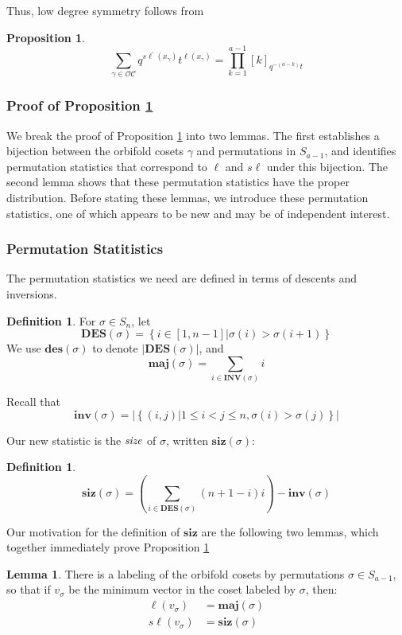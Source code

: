 \documentclass{amsart}[12pt]
\theoremstyle{definition}
\newtheorem{lemma}[dummy]{Lemma}
\newtheorem{definition}[dummy]{Definition}
\newtheorem{proposition}[dummy]{Proposition}
\newcommand{\OC}{\mathcal{OC}}
\newcommand{\sk}{s\ell}
\newcommand{\inv}{\mathbf{inv}}
\newcommand{\INV}{\mathbf{INV}}
\newcommand{\DES}{\mathbf{DES}}
\newcommand{\des}{\mathbf{des}}
\newcommand{\maj}{\mathbf{maj}}
\newcommand{\siz}{\mathbf{siz}}
\begin{document}
Thus, low degree symmetry follows from
\begin{proposition} \label{prop:orbcosets}
$$\sum_{\gamma\in\OC} q^{\sk^\prime(x_\gamma)}t^{\ell(x_\gamma)}=\prod_{k=1}^{a-1}[k]_{q^{-(a-k)}t}$$ 

\end{proposition}
  
\subsubsection{Proof of Proposition \ref{prop:orbcosets}}

We break the proof of Proposition \ref{prop:orbcosets} into two lemmas.  The first establishes a bijection between the orbifold cosets $\gamma$ and permutations in $S_{a-1}$, and identifies permutation statistics that correspond to $\ell$ and $\sk$ under this bijection.  The second lemma shows that these permutation statistics have the proper distribution.  Before stating these lemmas, we introduce these permutation statistics, one of which appears to be new and may be of independent interest.

\subsubsection{Permutation Statitistics}
The permutation statistics we need are defined in terms of descents and inversions.
\begin{definition} \label{def:standardpermutations}
For $\sigma\in S_n$, let 
$$\DES(\sigma)=\left\{i\in [1, n-1] \Big | \sigma(i)>\sigma(i+1)\right\}$$
We use $\des(\sigma)$ to denote $|\DES(\sigma)|$, and 
$$\maj(\sigma)=\sum_{i\in\INV(\sigma)} i$$

Recall that 
$$\inv(\sigma)=\left|\left\{(i,j)\big| 1\leq i<j\leq n, \sigma(i)>\sigma(j)\right\}\right|$$
\end{definition}

Our new statistic is the $\emph{size}$ of $\sigma$, written $\siz(\sigma)$: 

\begin{definition} \label{def:sizepermutation}
$$\siz(\sigma)=\left(\sum_{i\in\DES(\sigma)} (n+1-i)i\right)-\inv(\sigma)$$
\end{definition}


Our motivation for the definition of $\siz$ are the following two lemmas, which together immediately prove Proposition \ref{prop:orbcosets}

\begin{lemma} \label{lem:sizmaj1}
There is a labeling of the orbifold cosets by permutations $\sigma\in S_{a-1}$, so that if $v_\sigma$ be the minimum vector in the coset labeled by $\sigma$, then:
\begin{align*}
\ell(v_\sigma)&=\maj(\sigma) \\
\sk(v_\sigma)&=\siz(\sigma)\\
\end{align*}

\end{lemma}
\end{document}

